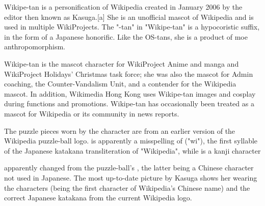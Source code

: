 Wikipe-tan  is a personification of Wikipedia created in January 2006 by the editor then known as Kasuga.[a] She is an unofficial mascot of Wikipedia and is used in multiple WikiProjects. The "-tan" in "Wikipe-tan" is a hypocoristic suffix, in the form of a Japanese honorific. Like the OS-tans, she is a product of moe anthropomorphism.

Wikipe-tan is the mascot character for WikiProject Anime and manga and WikiProject Holidays' Christmas task force; she was also the mascot for Admin coaching, the Counter-Vandalism Unit, and a contender for the Wikipedia mascot. In addition, Wikimedia Hong Kong uses Wikipe-tan images and cosplay during functions and promotions. Wikipe-tan has occasionally been treated as a mascot for Wikipedia or its community in news reports.

The puzzle pieces worn by the character are from an earlier version of the Wikipedia puzzle-ball logo.  is apparently a misspelling of  ("wi"), the first syllable of the Japanese katakana transliteration of "Wikipedia", while  is a kanji character 


apparently changed from the puzzle-ball's , the latter being a Chinese character not used in Japanese. The most up-to-date picture by Kasuga shows her wearing the characters  (being the first character of Wikipedia's Chinese name) and the correct Japanese katakana from the current Wikipedia logo.


